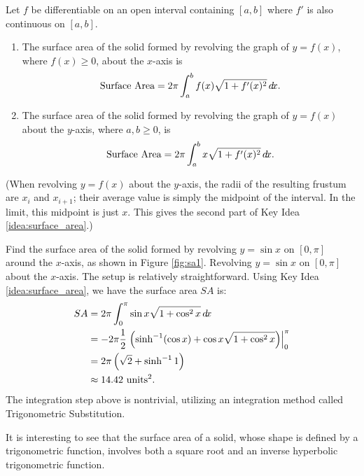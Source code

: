 \documentclass{ximera}
\begin{document}
Let $f$ be differentiable on an open interval containing $[a,b]$ where
$f'$ is also continuous on $[a,b]$.
\begin{enumerate}
\item The surface area of the solid formed by revolving the graph of
  $y=f(x)$, where $f(x)\geq0$, about the $x$-axis is
  \[
  \text{Surface Area} = 2\pi\int_a^b f(x)\sqrt{1+f'(x)^2}\mathop{}\!d\! x.
  \]
\item The surface area of the solid formed by revolving the graph of
  $y=f(x)$ about the $y$-axis, where $a,b\ge 0$, is
  \[
  \text{Surface Area} = 2\pi\int_a^b x\sqrt{1+f'(x)^2}\mathop{}\!d\! x.
  \]
\end{enumerate}


(When revolving $y=f(x)$ about the $y$-axis, the radii of the
resulting frustum are $x_i$ and $x_{i+1}$; their average value is
simply the midpoint of the interval. In the limit, this midpoint is
just $x$. This gives the second part of Key Idea
\ref{idea:surface_area}.)

\begin{example}
Find the surface area of the solid formed by revolving $y=\sin x$ on
$[0,\pi]$ around the $x$-axis, as shown in Figure \ref{fig:sa1}.
Revolving $y=\sin x$ on $[0,\pi]$ about the $x$-axis.  The setup is
relatively straightforward. Using Key Idea \ref{idea:surface_area}, we
have the surface area $SA$ is:
\begin{align*}
SA  &=	2\pi\int_0^\pi \sin x\sqrt{1+\cos^2x}\mathop{}\!d\! x \\
		&=	-2\pi\frac12\left.\left(\sinh^{-1}(\cos x)+\cos x\sqrt{1+\cos^2x}\right)\right|_0^\pi \\
		&= 2\pi\left(\sqrt{2}+\sinh^{-1} 1\right) \\
		&\approx 14.42\ \text{units}^2.
\end{align*}
The integration step above is nontrivial, utilizing an integration method called Trigonometric Substitution. 

It is interesting to see that the surface area of a solid, whose shape is defined by a trigonometric function, involves both a square root and an inverse hyperbolic trigonometric function.
\end{example}
\end{document}
